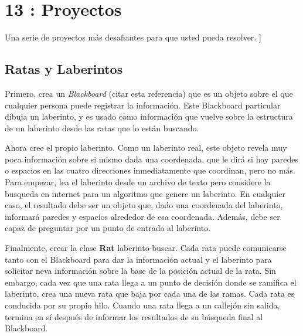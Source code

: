 \section*{13 : Proyectos}
\label{sec:proy}


Una serie de proyectos más desafiantes para que usted pueda resolver. \newline
[[Algunos de estos pueden convertirse en ejemplos en el libro, por lo que en algún momento podría desaparecer de aquí]]

\subsection*{Ratas y Laberintos}
\label{subsec:ratas}


Primero, crea un \textit{Blackboard }\newline(citar esta referencia) que es un objeto sobre el que cualquier persona puede registrar la información. Este Blackboard particular  dibuja un laberinto, y es usado como información que vuelve sobre la estructura de un laberinto desde  las ratas que lo están  buscando. \newline

Ahora cree el propio laberinto. Como un laberinto real, este objeto revela muy poca información sobre si mismo \-dada una coordenada, que le dirá si hay paredes o espacios en las cuatro direcciones  inmediatamente que coordinan, pero no más.  Para empezar, lea el laberinto desde un archivo de texto pero considere la busqueda en internet para un algoritmo que genere un laberinto. En cualquier caso, el resultado debe ser un objeto que, dado una coordenada del laberinto, informará paredes y espacios alrededor de esa coordenada. Además, debe ser capaz de preguntar por un punto de entrada al laberinto.  \newline

Finalmente, crear la clase \textbf{Rat} laberinto-buscar. Cada rata puede comunicarse tanto con el Blackboard para dar la información actual y el laberinto para solicitar neva información sobre la base de la posición actual de la rata. Sin embargo, cada vez que una rata llega a un punto de decisión donde se ramifica el laberinto, crea una nueva rata que baja por cada una de las ramas. Cada rata es conducida por su propio hilo.   Cuando una rata llega a un callejón sin salida, termina en sí después de informar los resultados de su búsqueda final al Blackboard.\newline

